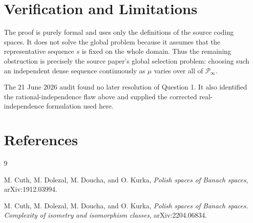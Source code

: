 \documentclass[11pt]{article}
\newcommand{\PP}{\mathcal P}
\begin{document}
\section*{Verification and Limitations}

The proof is purely formal and uses only the definitions of the source coding
spaces. It does not solve the global problem because it assumes that the
representative sequence \(s\) is fixed on the whole domain. Thus the remaining
obstruction is precisely the source paper's global selection problem: choosing
such an independent dense sequence continuously as \(\mu\) varies over all of
\(\PP_\infty\).

The 21 June 2026 audit found no later resolution of Question 1.  It also
identified the rational-independence flaw above and supplied the corrected
real-independence formulation used here.

\section*{References}

\begin{thebibliography}{9}

M. Cuth, M. Dolezal, M. Doucha, and O. Kurka,
\emph{Polish spaces of Banach spaces},
arXiv:1912.03994.

M. Cuth, M. Dolezal, M. Doucha, and O. Kurka,
\emph{Polish spaces of Banach spaces. Complexity of isometry and isomorphism classes},
arXiv:2204.06834.

\end{thebibliography}
\end{document}
